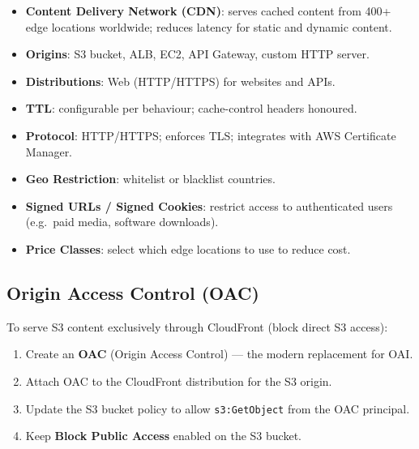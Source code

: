 

\begin{keyfacts}
\begin{itemize}
  \item \textbf{Content Delivery Network (CDN)}: serves cached content from 400+ edge
        locations worldwide; reduces latency for static and dynamic content.
  \item \textbf{Origins}: S3 bucket, ALB, EC2, API Gateway, custom HTTP server.
  \item \textbf{Distributions}: Web (HTTP/HTTPS) for websites and APIs.
  \item \textbf{TTL}: configurable per behaviour; cache-control headers honoured.
  \item \textbf{Protocol}: HTTP/HTTPS; enforces TLS; integrates with AWS Certificate Manager.
  \item \textbf{Geo Restriction}: whitelist or blacklist countries.
  \item \textbf{Signed URLs / Signed Cookies}: restrict access to authenticated users
        (e.g.\ paid media, software downloads).
  \item \textbf{Price Classes}: select which edge locations to use to reduce cost.
\end{itemize}
\end{keyfacts}

\subsection{Origin Access Control (OAC)}

To serve S3 content exclusively through CloudFront (block direct S3 access):
\begin{enumerate}
  \item Create an \textbf{OAC} (Origin Access Control) --- the modern replacement for OAI.
  \item Attach OAC to the CloudFront distribution for the S3 origin.
  \item Update the S3 bucket policy to allow \texttt{s3:GetObject} from the OAC principal.
  \item Keep \textbf{Block Public Access} enabled on the S3 bucket.
\end{enumerate}

